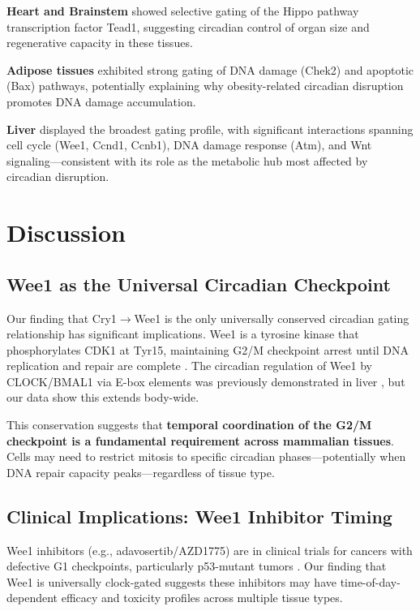 \documentclass[11pt,letterpaper]{article}
\begin{document}
\textbf{Heart and Brainstem} showed selective gating of the Hippo pathway transcription factor Tead1, suggesting circadian control of organ size and regenerative capacity in these tissues.

\textbf{Adipose tissues} exhibited strong gating of DNA damage (Chek2) and apoptotic (Bax) pathways, potentially explaining why obesity-related circadian disruption promotes DNA damage accumulation.

\textbf{Liver} displayed the broadest gating profile, with significant interactions spanning cell cycle (Wee1, Ccnd1, Ccnb1), DNA damage response (Atm), and Wnt signaling---consistent with its role as the metabolic hub most affected by circadian disruption.

\section{Discussion}

\subsection{Wee1 as the Universal Circadian Checkpoint}

Our finding that Cry1$\rightarrow$Wee1 is the only universally conserved circadian gating relationship has significant implications. Wee1 is a tyrosine kinase that phosphorylates CDK1 at Tyr15, maintaining G2/M checkpoint arrest until DNA replication and repair are complete \citep{mcgowan1995}. The circadian regulation of Wee1 by CLOCK/BMAL1 via E-box elements was previously demonstrated in liver \citep{matsuo2003}, but our data show this extends body-wide.

This conservation suggests that \textbf{temporal coordination of the G2/M checkpoint is a fundamental requirement across mammalian tissues}. Cells may need to restrict mitosis to specific circadian phases---potentially when DNA repair capacity peaks---regardless of tissue type.

\subsection{Clinical Implications: Wee1 Inhibitor Timing}

Wee1 inhibitors (e.g., adavosertib/AZD1775) are in clinical trials for cancers with defective G1 checkpoints, particularly p53-mutant tumors \citep{leijen2016}. Our finding that Wee1 is universally clock-gated suggests these inhibitors may have time-of-day-dependent efficacy and toxicity profiles across multiple tissue types.
\end{document}
